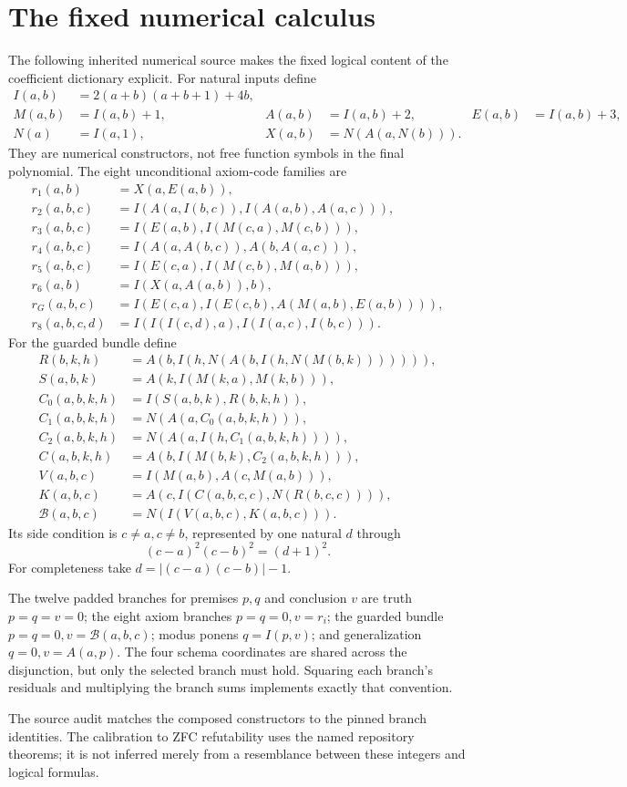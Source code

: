 \section{The fixed numerical calculus}
\label{app:calculus}

The following inherited numerical source
\cite{shared} makes the fixed logical
content of the coefficient dictionary
explicit. For natural inputs define
\begin{align*}
 I(a,b)&=2(a+b)(a+b+1)+4b,\\
 M(a,b)&=I(a,b)+1,& A(a,b)&=I(a,b)+2,& E(a,b)&=I(a,b)+3,\\
 N(a)&=I(a,1),&X(a,b)&=N(A(a,N(b))).
\end{align*}
They are numerical constructors, not
free function symbols in the final
polynomial. The eight unconditional
axiom-code families are
\begin{align*}
 r_1(a,b)&=X(a,E(a,b)),\\
 r_2(a,b,c)&=I(A(a,I(b,c)),I(A(a,b),A(a,c))),\\
 r_3(a,b,c)&=I(E(a,b),I(M(c,a),M(c,b))),\\
 r_4(a,b,c)&=I(A(a,A(b,c)),A(b,A(a,c))),\\
 r_5(a,b,c)&=I(E(c,a),I(M(c,b),M(a,b))),\\
 r_6(a,b)&=I(X(a,A(a,b)),b),\\
 r_G(a,b,c)&=I(E(c,a),I(E(c,b),A(M(a,b),E(a,b)))),\\
 r_8(a,b,c,d)&=I(I(I(c,d),a),I(I(a,c),I(b,c))).
\end{align*}
For the guarded bundle define
\begin{align*}
 R(b,k,h)&=A(b,I(h,N(A(b,I(h,N(M(b,k))))))),\\
 S(a,b,k)&=A(k,I(M(k,a),M(k,b))),\\
 C_0(a,b,k,h)&=I(S(a,b,k),R(b,k,h)),\\
 C_1(a,b,k,h)&=N(A(a,C_0(a,b,k,h))),\\
 C_2(a,b,k,h)&=N(A(a,I(h,C_1(a,b,k,h)))),\\
 C(a,b,k,h)&=A(b,I(M(b,k),C_2(a,b,k,h))),\\
 V(a,b,c)&=I(M(a,b),A(c,M(a,b))),\\
 K(a,b,c)&=A(c,I(C(a,b,c,c),N(R(b,c,c)))),\\
 \mathcal B(a,b,c)&=N(I(V(a,b,c),K(a,b,c))).
\end{align*}
Its side condition is $c\ne a,c\ne b$,
represented by one natural $d$ through
\[
 (c-a)^2(c-b)^2=(d+1)^2.
\]
For completeness take
$d=|(c-a)(c-b)|-1$.

The twelve padded branches for
premises $p,q$ and conclusion $v$ are
truth $p=q=v=0$; the eight axiom
branches $p=q=0,v=r_i$; the guarded
bundle $p=q=0,v=\mathcal B(a,b,c)$;
modus ponens $q=I(p,v)$; and
generalization $q=0,v=A(a,p)$.
The four schema coordinates are
shared across the disjunction,
but only the selected branch
must hold. Squaring each branch's
residuals and multiplying the
branch sums implements exactly
that convention.

The source audit matches the
composed constructors to the
pinned branch identities.
The calibration to ZFC
refutability uses the named
repository theorems; it is not
inferred merely from a resemblance
between these integers and
logical formulas.
